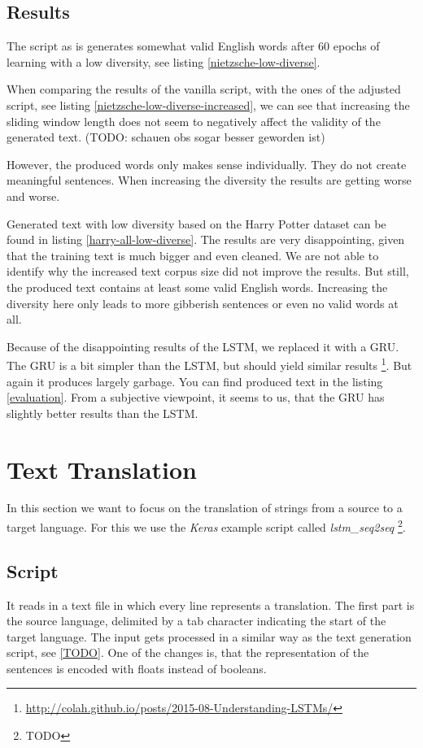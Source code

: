 \documentclass{article}[]
\begin{document}
\subsection{Results}
The script as is generates somewhat valid English words after 60 epochs of learning with a low diversity, see listing \ref{nietzsche-low-diverse}.

When comparing the results of the vanilla script,  with the ones of the adjusted script, see listing \ref{nietzsche-low-diverse-increased}, we can see that increasing the sliding window length does not seem to negatively affect the validity of the generated text. (TODO: schauen obs sogar besser geworden ist)

However, the produced words only makes sense individually.
They do not create meaningful sentences.
When increasing the diversity the results are getting worse and worse.

Generated text with low diversity based on the Harry Potter dataset can be found in listing \ref{harry-all-low-diverse}.
The results are very disappointing, given that the training text is much bigger and even cleaned.
We are not able to identify why the increased text corpus size did not improve the results.
But still, the produced text contains at least some valid English words.
Increasing the diversity here only leads to more gibberish sentences or even no valid words at all.

Because of the disappointing results of the LSTM, we replaced it with a GRU.
The GRU is a bit simpler than the LSTM, but should yield similar results \footnote{\url{http://colah.github.io/posts/2015-08-Understanding-LSTMs/}}.
But again it produces largely garbage.
You can find produced text in the listing \ref{evaluation}.
From a subjective viewpoint, it seems to us, that  the GRU has slightly better results than the LSTM.

\section{Text Translation}
\label{sec:trans}
In this section we want to focus on the translation of strings from a source to a target language.
For this we use the \emph{Keras} example script called \emph{lstm\_seq2seq} \footnote{TODO}.

\subsection{Script}
It reads in a text file in which every line represents a translation.
The first part is the source language, delimited by a tab character indicating the start of the target language.
The input gets processed in a similar way as the text generation script, see \ref{TODO}.
One of the changes is, that the representation of the sentences is encoded with floats instead of booleans.
\end{document}

